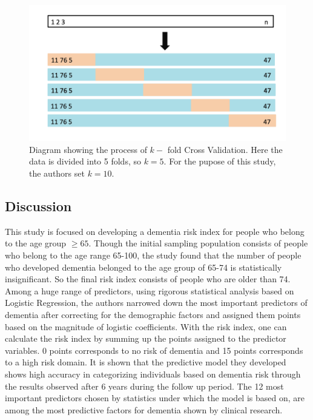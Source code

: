 \documentclass[12pt,letterpaper]{article}
\begin{document}
\begin{figure}[t!]
\centering
\includegraphics[width=15cm]{CV.png}
\caption{Diagram showing the process of $k-$ fold Cross Validation. Here the data is divided into 5 folds, so $k=5$. For the pupose of this study, the authors set $k=10$. }
\label{plotrisk}
\end{figure}
\subsection{Discussion}

This study is focused on developing a dementia risk index for people who belong to the age group $\geq 65$. Though the initial sampling population consists of people who belong to the age range 65-100, the study found that the number of people who developed dementia belonged to the age group of 65-74 is statistically insignificant. So the final risk index consists of people who are older than 74. Among a huge range of predictors, using rigorous statistical analysis based on Logistic Regression, the authors narrowed down the most important predictors of dementia after correcting for the demographic factors and assigned them points based on the magnitude of logistic coefficients. With the risk index, one can calculate the risk index by summing up the points assigned to the predictor variables. 0 points corresponds to no risk of dementia and 15 points corresponds to a high risk domain. It is shown that the predictive model they developed shows high accuracy in categorizing individuals based on dementia risk through the results observed after 6 years during the follow up period. The 12 most important predictors chosen by statistics under which the model is based on, are among the most predictive factors for dementia shown by clinical research. \\
\end{document}
